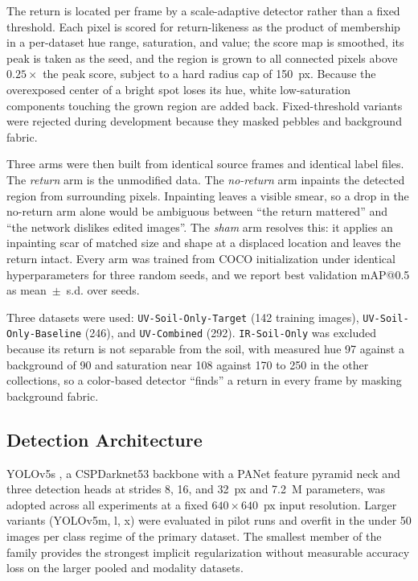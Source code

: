 ﻿\documentclass[journal]{IEEEtran}
\begin{document}
The return is located per frame by a scale-adaptive detector rather than a fixed threshold. Each pixel is scored for return-likeness as the product of membership in a per-dataset hue range, saturation, and value; the score map is smoothed, its peak is taken as the seed, and the region is grown to all connected pixels above $0.25\times$ the peak score, subject to a hard radius cap of 150~px. Because the overexposed center of a bright spot loses its hue, white low-saturation components touching the grown region are added back. Fixed-threshold variants were rejected during development because they masked pebbles and background fabric.

Three arms were then built from identical source frames and identical label files. The \emph{return} arm is the unmodified data. The \emph{no-return} arm inpaints the detected region from surrounding pixels. Inpainting leaves a visible smear, so a drop in the no-return arm alone would be ambiguous between ``the return mattered'' and ``the network dislikes edited images''. The \emph{sham} arm resolves this: it applies an inpainting scar of matched size and shape at a displaced location and leaves the return intact. Every arm was trained from COCO initialization under identical hyperparameters for three random seeds, and we report best validation mAP@0.5 as mean~$\pm$~s.d. over seeds.

Three datasets were used: \texttt{UV-Soil-Only-Target} (142 training images), \texttt{UV-Soil-Only-Baseline} (246), and \texttt{UV-Combined} (292). \texttt{IR-Soil-Only} was excluded because its return is not separable from the soil, with measured hue 97 against a background of 90 and saturation near 108 against 170 to 250 in the other collections, so a color-based detector ``finds'' a return in every frame by masking background fabric.

\subsection{Detection Architecture}
YOLOv5s \cite{jocher2020yolov5}, a CSPDarknet53 backbone with a PANet feature pyramid neck and three detection heads at strides 8, 16, and 32~px and 7.2~M parameters, was adopted across all experiments at a fixed $640 \times 640$~px input resolution. Larger variants (YOLOv5m, l, x) were evaluated in pilot runs and overfit in the under 50 images per class regime of the primary dataset. The smallest member of the family provides the strongest implicit regularization without measurable accuracy loss on the larger pooled and modality datasets.
\end{document}
